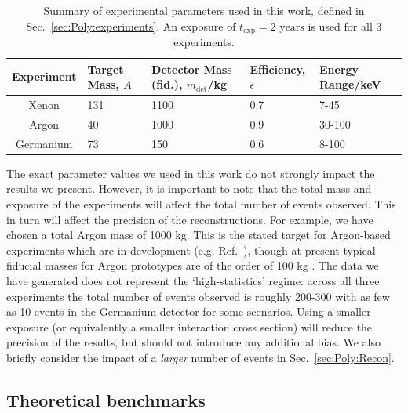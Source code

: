 \begin{table}[t]
  \setlength{\extrarowheight}{2pt}
  \begin{center}
	\begin{tabular}{c|m{1.2cm}m{2.2cm}m{2.1cm}m{2.1cm}}
        \hline\hline
	Experiment  & Target Mass, $A$ & Detector Mass (fid.), $m_\textrm{det}$/kg & Efficiency, $\epsilon$ & Energy Range/keV\\
	\hline
	Xenon  & 131  & 1100 \cite{Aprile:2012a} & 0.7 \cite{Aprile:2012b} & 7-45 \cite{Aprile:2010} \\
	Argon  & 40  & 1000 & 0.9 \cite{Benetti:2007} & 30-100 \cite{Grandi:2005} \\
        Germanium  & 73  & 150 \cite{Bauer:2013b} & 0.6 \cite{Bauer:2013a} & 8-100 \cite{Bauer:2013a} \\
        \hline\hline
	\end{tabular}
  \end{center}
\caption[Parameter values used for the three mock experiments used in Chapter \ref{ch:Poly}]{Summary of experimental parameters used in this work, defined in Sec.~\ref{sec:Poly:experiments}. An exposure of $t_\textrm{exp} = 2 \textrm{ years}$ is used for all 3 experiments.}
\label{tab:Poly:experiments}
\end{table}

The exact parameter values we used in this work do not strongly impact the results we present. However, it is important to note that the total mass and exposure of the experiments will affect the total number of events observed. This in turn will affect the precision of the reconstructions. For example, we have chosen a total Argon mass of 1000 kg. This is the stated target for Argon-based experiments which are in development (e.g. Ref.~\cite{Badertscher:2013}), though at present typical fiducial masses for Argon prototypes are of the order of 100 kg \cite{Grandi:2005}. The data we have generated does not represent the `high-statistics' regime: across all three experiments the total number of events observed is roughly 200-300 with as few as 10 events in the Germanium detector for some scenarios. Using a smaller exposure (or equivalently a smaller interaction cross section) will reduce the precision of the results, but should not introduce any additional bias. We also briefly consider the impact of a \textit{larger} number of events in Sec.~\ref{sec:Poly:Recon}.

\subsection{Theoretical benchmarks}
\label{sec:Poly:benchmarks}


